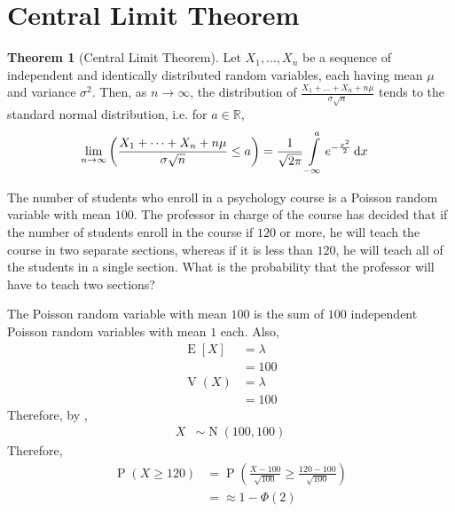 \documentclass[titlepage, fleqn, a4paper, 12pt, twoside]{article}
\theoremstyle{definition}
\theoremstyle{theorem}
\newtheorem{theorem}{Theorem}
\DeclareMathOperator{\prob}{\mathrm{P}}
\DeclareMathOperator{\expct}{\mathrm{E}}
\DeclareMathOperator{\var}{\mathrm{V}}
\DeclareMathOperator{\normal}{\mathrm{N}}
\begin{document}
\section{Central Limit Theorem}

\begin{theorem}[Central Limit Theorem]
	Let $X_1, \dots, X_n$ be a sequence of independent and identically distributed random variables, each having mean $\mu$ and variance $\sigma^2$.
	Then, as $n \to \infty$, the distribution of $\frac{X_1 + \dots + X_n + n \mu}{\sigma \sqrt{n}}$ tends to the standard normal distribution, i.e. for $a \in \mathbb{R}$,
	\begin{align*}
		\lim\limits_{n \to \infty} \left( \frac{X_1 + \dots + X_n + n \mu}{\sigma \sqrt{n}} \le a \right) &= \frac{1}{\sqrt{2 \pi}} \int\limits_{-\infty}^{a} e^{-\frac{x^2}{2}} \dif x
	\end{align*}
	\label{thm:Central_Limit_Theorem}
\end{theorem}

\begin{question}
	The number of students who enroll in a psychology course is a Poisson random variable with mean $100$.
	The professor in charge of the course has decided that if the number of students enroll in the course if $120$ or more, he will teach the course in two separate sections, whereas if it is less than $120$, he will teach all of the students in a single section.
	What is the probability that the professor will have to teach two sections?
\end{question}

\begin{solution}
	The Poisson random variable with mean $100$ is the sum of $100$ independent Poisson random variables with mean $1$ each.
	Also,
	\begin{align*}
		\expct[X] &= \lambda\\
		&= 100\\
		\var(X) &= \lambda\\
		&= 100
	\end{align*}
	Therefore, by ,
	\begin{align*}
		X &\sim \normal(100,100)
	\end{align*}
	Therefore,
	\begin{align*}
		\prob(X \ge 120) &= \prob\left( \frac{X - 100}{\sqrt{100}} \ge \frac{120 - 100}{\sqrt{100}} \right)\\
		&= \approx 1 - \Phi(2)
	\end{align*}
\end{solution}
\end{document}
